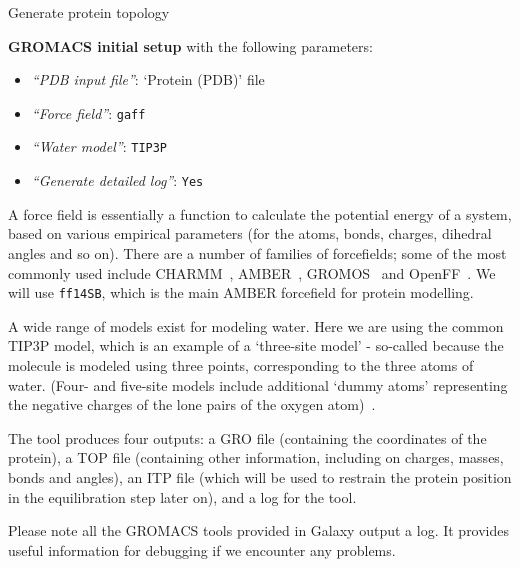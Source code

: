 \documentclass[twocolumn]{bmcart}%
\providecommand{\tightlist}{%
  \setlength{\itemsep}{0pt}\setlength{\parskip}{0pt}}
\begin{document}
\begin{handson_box_colour}{Generate protein topology}

  \textbf{GROMACS initial setup} with the following parameters:

  \begin{itemize}
  \tightlist
  \item
    \emph{``PDB input file''}: `Protein (PDB)' file
  \item
    \emph{``Force field''}: \texttt{gaff}
  \item
    \emph{``Water model''}: \texttt{TIP3P}
  \item
    \emph{``Generate detailed log''}: \texttt{Yes}
  \end{itemize}
\end{handson_box_colour}

A force field is essentially a function to calculate the potential energy of a system, based on various empirical parameters (for the atoms, bonds, charges, dihedral angles and so on). There are a number of families of forcefields; some of the most commonly used include CHARMM~\cite{Vanommeslaeghe2009}, AMBER~\cite{Maier2015}, GROMOS~\cite{reif2012} and OpenFF~\cite{Mobley2018}. We will use \texttt{ff14SB}, which is the main AMBER forcefield for protein modelling.

A wide range of models exist for modeling water. Here we are using the common TIP3P model, which is an example of a `three-site model' - so-called because the molecule is modeled using three points, corresponding to the three atoms of water. (Four- and five-site models include additional `dummy atoms' representing the negative charges of the lone pairs of the oxygen atom)~\cite{Onufriev2017}.

The tool produces four outputs: a GRO file (containing the coordinates
of the protein), a TOP file (containing other information, including on
charges, masses, bonds and angles), an ITP file (which will be used to
restrain the protein position in the equilibration step later on), and a
log for the tool.

Please note all the GROMACS tools provided in Galaxy output a log. It provides useful information for
debugging if we encounter any problems.
\end{document}
